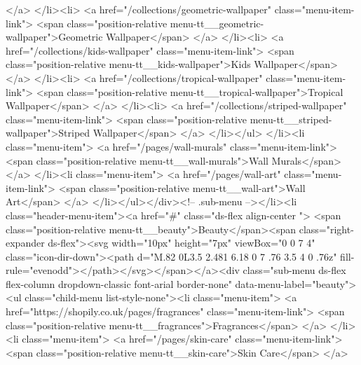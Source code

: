 {{{{{                          </a>
                        </li><li>
                          <a href="/collections/geometric-wallpaper" class="menu-item-link">
                            <span class="position-relative menu-tt__geometric-wallpaper">Geometric Wallpaper</span>
                          </a>
                        </li><li>
                          <a href="/collections/kids-wallpaper" class="menu-item-link">
                            <span class="position-relative menu-tt__kids-wallpaper">Kids Wallpaper</span>
                          </a>
                        </li><li>
                          <a href="/collections/tropical-wallpaper" class="menu-item-link">
                            <span class="position-relative menu-tt__tropical-wallpaper">Tropical Wallpaper</span>
                          </a>
                        </li><li>
                          <a href="/collections/striped-wallpaper" class="menu-item-link">
                            <span class="position-relative menu-tt__striped-wallpaper">Striped Wallpaper</span>
                          </a>
                        </li></ul>
                  </li><li class="menu-item">
                    <a href="/pages/wall-murals" class="menu-item-link">
                      <span class="position-relative menu-tt__wall-murals">Wall Murals</span>
                    </a>
                  </li><li class="menu-item">
                    <a href="/pages/wall-art" class="menu-item-link">
                      <span class="position-relative menu-tt__wall-art">Wall Art</span>
                    </a>
                  </li></ul></div><!-- .sub-menu --></li><li class="header-menu-item"><a href="#" class="ds-flex align-center ">
          <span class="position-relative menu-tt__beauty">Beauty</span><span class="right-expander ds-flex"><svg width="10px" height="7px" viewBox="0 0 7 4" class="icon-dir-down"><path d="M.82 0L3.5 2.481 6.18 0 7 .76 3.5 4 0 .76z" fill-rule="evenodd"></path></svg></span></a><div class="sub-menu ds-flex flex-column dropdown-classic font-arial border-none" data-menu-label="beauty"><ul class="child-menu list-style-none"><li class="menu-item">
                    <a href="https://shopily.co.uk/pages/fragrances" class="menu-item-link">
                      <span class="position-relative menu-tt__fragrances">Fragrances</span>
                    </a>
                  </li><li class="menu-item">
                    <a href="/pages/skin-care" class="menu-item-link">
                      <span class="position-relative menu-tt__skin-care">Skin Care</span>
                    </a>
}}}}}

